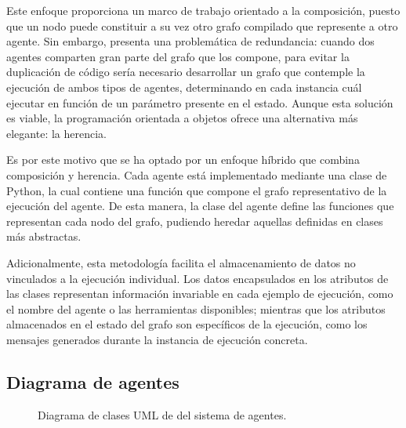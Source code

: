 Este enfoque proporciona un marco de trabajo orientado a la composición, puesto que un nodo puede constituir a su vez otro grafo compilado que represente a otro agente. Sin embargo, presenta una problemática de redundancia: cuando dos agentes comparten gran parte del grafo que los compone, para evitar la duplicación de código sería necesario desarrollar un grafo que contemple la ejecución de ambos tipos de agentes, determinando en cada instancia cuál ejecutar en función de un parámetro presente en el estado. Aunque esta solución es viable, la programación orientada a objetos ofrece una alternativa más elegante: la herencia.

Es por este motivo que se ha optado por un enfoque híbrido que combina composición y herencia. Cada agente está implementado mediante una clase de Python, la cual contiene una función que compone el grafo representativo de la ejecución del agente. De esta manera, la clase del agente define las funciones que representan cada nodo del grafo, pudiendo heredar aquellas definidas en clases más abstractas.

Adicionalmente, esta metodología facilita el almacenamiento de datos no vinculados a la ejecución individual. Los datos encapsulados en los atributos de las clases representan información invariable en cada ejemplo de ejecución, como el nombre del agente o las herramientas disponibles; mientras que los atributos almacenados en el estado del grafo son específicos de la ejecución, como los mensajes generados durante la instancia de ejecución concreta.

\subsection{Diagrama de agentes}

\begin{figure}[p]
  \centering
  \caption{Diagrama de clases UML de del sistema de agentes.}
  \label{fig:uml}
\end{figure}

